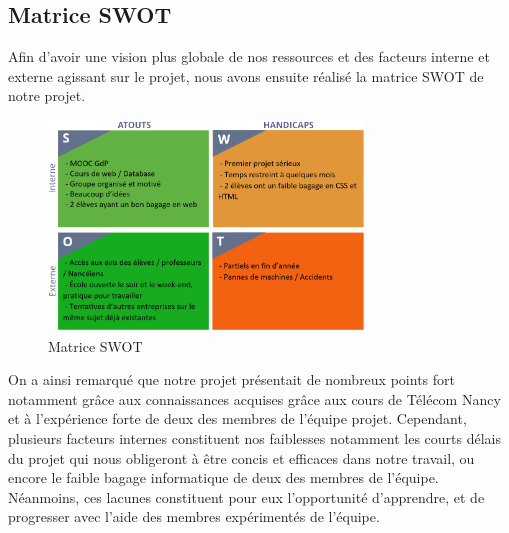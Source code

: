 \documentclass[french,a4paper]{article}
\begin{document}
\subsection{Matrice SWOT}
Afin d’avoir une vision plus globale de nos ressources et des facteurs interne et externe agissant sur le projet, nous avons ensuite réalisé la matrice SWOT de notre projet.

\begin{figure}[H]
    \centering
    \includegraphics[width=0.75\textwidth]{img/SWOT.png}
    \caption{Matrice SWOT}
\end{figure} 

On a ainsi remarqué que notre projet présentait de nombreux points fort notamment grâce aux connaissances acquises grâce aux cours de Télécom Nancy et à l’expérience forte de deux des membres de l’équipe projet.  Cependant, plusieurs facteurs internes constituent nos faiblesses notamment les courts délais du projet qui nous obligeront à être concis et efficaces dans notre travail, ou encore le faible bagage informatique de deux des membres de l’équipe. Néanmoins, ces lacunes constituent pour eux l’opportunité d’apprendre, et de progresser avec l’aide des membres expérimentés de l’équipe.
\end{document}
